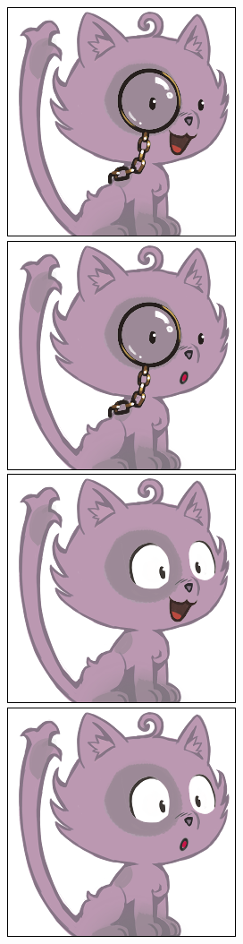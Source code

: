 \documentclass[a4paper, 12pt]{article}
\begin{document}
  \includegraphics[scale=0.45]{out/26.png}
  \includegraphics[scale=0.45]{out/29.png}
  \includegraphics[scale=0.45]{out/32.png}
  \includegraphics[scale=0.45]{out/35.png}
\end{document}
